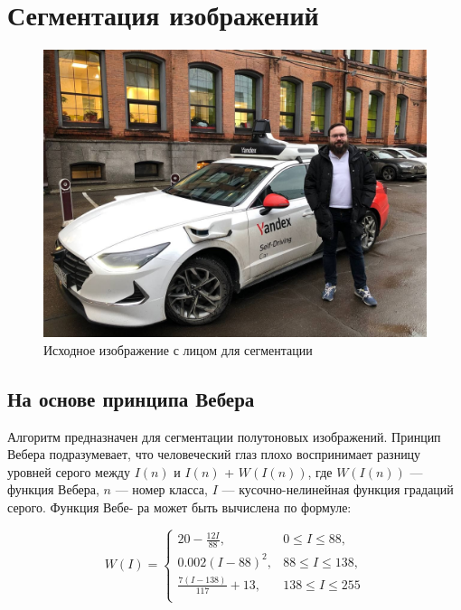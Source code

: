\pagebreak

\section{Сегментация изображений}

\begin{figure}[ht]
    \includegraphics[width=\textwidth]{../source/face.png}
    \caption{Исходное изображение с лицом для сегментации}
    \label{fig:р}
\end{figure}

\subsection{На основе принципа Вебера}

Алгоритм предназначен для сегментации полутоновых изображений. Принцип Вебера подразумевает, что человеческий 
глаз плохо воспринимает разницу уровней серого между $I(n)$ и $I(n)$ + $W(I(n))$, 
где $W(I(n))$ — функция Вебера, $n$ — номер класса, $I$
— кусочно-нелинейная функция градаций серого. Функция Вебе-
ра может быть вычислена по формуле:

\begin{equation}
    W(I) = \begin{cases}
        20 - \frac{12I}{88}, & 0 \leq I \leq 88, \\[1pt]
        0.002(I - 88)^2, & 88 \leq I \leq 138,\\[1pt]
        \frac{7(I - 138)}{117} + 13, & 138 \leq I \leq 255\\[1pt]
    \end{cases} 
\label{eq:complex_func}
\end{equation}

